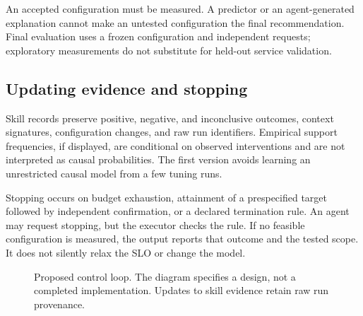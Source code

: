 \documentclass[11pt,a4paper]{article}
\begin{document}
An accepted configuration must be measured. A predictor or an agent-generated explanation cannot make an untested configuration the final recommendation. Final evaluation uses a frozen configuration and independent requests; exploratory measurements do not substitute for held-out service validation.

\subsection{Updating evidence and stopping}
Skill records preserve positive, negative, and inconclusive outcomes, context signatures, configuration changes, and raw run identifiers. Empirical support frequencies, if displayed, are conditional on observed interventions and are not interpreted as causal probabilities. The first version avoids learning an unrestricted causal model from a few tuning runs.

Stopping occurs on budget exhaustion, attainment of a prespecified target followed by independent confirmation, or a declared termination rule. An agent may request stopping, but the executor checks the rule. If no feasible configuration is measured, the output reports that outcome and the tested scope. It does not silently relax the SLO or change the model.

\begin{figure}[t]
\centering
{}
\caption{Proposed control loop. The diagram specifies a design, not a completed implementation. Updates to skill evidence retain raw run provenance.}
\label{fig:architecture}
\end{figure}
\end{document}
